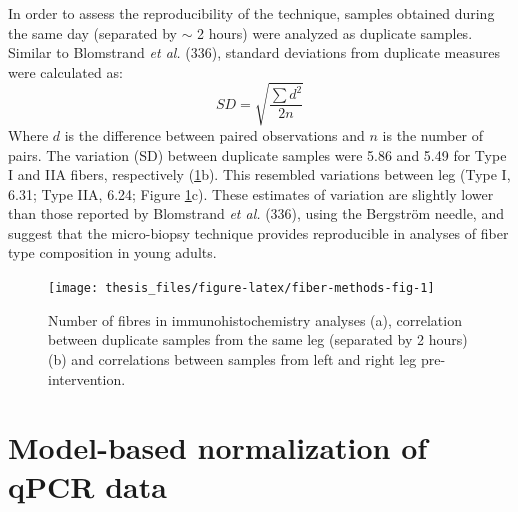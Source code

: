 \documentclass[twoside,10pt]{gihclass} %
\begin{document}
In order to assess the reproducibility of the technique, samples obtained during the same day (separated by \(\sim\) 2 hours) were analyzed as duplicate samples.
Similar to Blomstrand \emph{et al.} (336), standard deviations from duplicate measures were calculated as:
\[SD = \sqrt{\frac{\sum{d^2}}{2n}}\]
Where \(d\) is the difference between paired observations and \(n\) is the number of pairs.
The variation (SD) between duplicate samples were 5.86 and 5.49 for Type I and IIA fibers, respectively (\ref{fig:fiber-methods-fig}b).
This resembled variations between leg (Type I, 6.31; Type IIA, 6.24; Figure \ref{fig:fiber-methods-fig}c).
These estimates of variation are slightly lower than those reported by Blomstrand \emph{et al.} (336), using the Bergström needle, and suggest that the micro-biopsy technique provides reproducible in analyses of fiber type composition in young adults.
\begin{figure}

{\centering \texttt{[image: thesis\_files/figure-latex/fiber-methods-fig-1]} 

}

\caption[Characteristics of biopsy samples used in immunohistochemistry analyses.]{Number of fibres in immunohistochemistry analyses (a), correlation between duplicate samples from the same leg (separated by 2 hours) (b) and correlations between samples from left and right leg pre-intervention.}\label{fig:fiber-methods-fig}
\end{figure}
\hypertarget{model-based-normalization-of-qpcr-data}{%
\section{Model-based normalization of qPCR data}\label{model-based-normalization-of-qpcr-data}}
\end{document}
